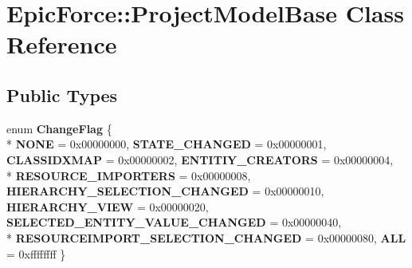 \hypertarget{class_epic_force_1_1_project_model_base}{}\section{Epic\+Force\+:\+:Project\+Model\+Base Class Reference}
\label{class_epic_force_1_1_project_model_base}
\subsection*{Public Types}
\begin{DoxyCompactItemize}
\item 
enum {\bfseries Change\+Flag} \{ \\*
{\bfseries N\+O\+NE} = 0x00000000, 
{\bfseries S\+T\+A\+T\+E\+\_\+\+C\+H\+A\+N\+G\+ED} = 0x00000001, 
{\bfseries C\+L\+A\+S\+S\+I\+D\+X\+M\+AP} = 0x00000002, 
{\bfseries E\+N\+T\+I\+T\+I\+Y\+\_\+\+C\+R\+E\+A\+T\+O\+RS} = 0x00000004, 
\\*
{\bfseries R\+E\+S\+O\+U\+R\+C\+E\+\_\+\+I\+M\+P\+O\+R\+T\+E\+RS} = 0x00000008, 
{\bfseries H\+I\+E\+R\+A\+R\+C\+H\+Y\+\_\+\+S\+E\+L\+E\+C\+T\+I\+O\+N\+\_\+\+C\+H\+A\+N\+G\+ED} = 0x00000010, 
{\bfseries H\+I\+E\+R\+A\+R\+C\+H\+Y\+\_\+\+V\+I\+EW} = 0x00000020, 
{\bfseries S\+E\+L\+E\+C\+T\+E\+D\+\_\+\+E\+N\+T\+I\+T\+Y\+\_\+\+V\+A\+L\+U\+E\+\_\+\+C\+H\+A\+N\+G\+ED} = 0x00000040, 
\\*
{\bfseries R\+E\+S\+O\+U\+R\+C\+E\+I\+M\+P\+O\+R\+T\+\_\+\+S\+E\+L\+E\+C\+T\+I\+O\+N\+\_\+\+C\+H\+A\+N\+G\+ED} = 0x00000080, 
{\bfseries A\+LL} = 0xffffffff
 \}\hypertarget{class_epic_force_1_1_project_model_base_a945664b7593cdcb0cfd72ae44e3d28a3}{}\label{class_epic_force_1_1_project_model_base_a945664b7593cdcb0cfd72ae44e3d28a3}

\end{DoxyCompactItemize}
